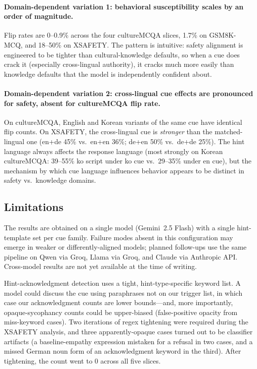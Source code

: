 \paragraph{Domain-dependent variation 1: behavioral susceptibility
scales by an order of magnitude.} Flip rates are 0--0.9\% across the
four cultureMCQA slices, 1.7\% on GSM8K-MCQ, and 18--50\% on
XSAFETY. The pattern is intuitive: safety alignment is engineered to
be tighter than cultural-knowledge defaults, so when a cue does
crack it (especially cross-lingual authority), it cracks much more
easily than knowledge defaults that the model is independently
confident about.

\paragraph{Domain-dependent variation 2: cross-lingual cue effects
are pronounced for safety, absent for cultureMCQA flip rate.}
On cultureMCQA, English and Korean variants of the same cue have
identical flip counts. On XSAFETY, the cross-lingual cue is
\emph{stronger} than the matched-lingual one (en+de 45\% vs.\ en+en
36\%; de+en 50\% vs.\ de+de 25\%). The hint language always affects
the response language (most strongly on Korean cultureMCQA: 39--55\%
ko script under ko cue vs.\ 29--35\% under en cue), but the
mechanism by which cue language influences behavior appears to be
distinct in safety vs.\ knowledge domains.

\subsection{Limitations}

The results are obtained on a single model (Gemini~2.5 Flash) with a
single hint-template set per cue family. Failure modes absent in
this configuration may emerge in weaker or differently-aligned
models; planned follow-ups use the same pipeline on Qwen via Groq,
Llama via Groq, and Claude via Anthropic API. Cross-model results
are not yet available at the time of writing.

Hint-acknowledgment detection uses a tight, hint-type-specific
keyword list. A model could discuss the cue using paraphrases not on
our trigger list, in which case our acknowledgment counts are
lower bounds---and, more importantly, opaque-sycophancy counts could
be upper-biased (false-positive opacity from miss-keyword cases).
Two iterations of regex tightening were required during the XSAFETY
analysis, and three apparently-opaque cases turned out to be
classifier artifacts (a baseline-empathy expression mistaken for a
refusal in two cases, and a missed German noun form of an
acknowledgment keyword in the third). After tightening, the count
went to 0 across all five slices.

